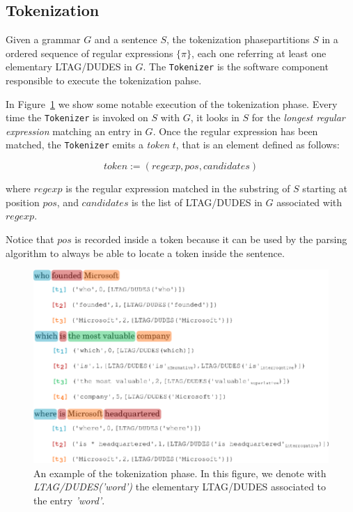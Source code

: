 \subsection{Tokenization}
\label{sec:parsing-tokenization}

Given a grammar $G$ and a sentence $S$, the tokenization phasepartitions $S$ in a ordered sequence of regular expressions $\{\pi\}$, each one referring at least one elementary LTAG/DUDES in $G$.
%
The \texttt{Tokenizer} is the software component responsible to execute the tokenization pahse.

In Figure~\ref{fig:tokenizer-sample} we show some notable execution of the tokenization phase.
%
Every time the \texttt{Tokenizer} is invoked on $S$ with $G$, it looks in $S$ for the \textit{longest regular expression} matching an entry in $G$.
%
Once the regular expression has been matched, the \texttt{Tokenizer} emits a \textit{token} $t$, that is an element defined as follows:

\begin{equation}
\label{eqn:token}
token:=(regexp,pos,candidates)
\end{equation}

where
$regexp$ is the regular expression matched in the substring of $S$ starting at position $pos$, and
$candidates$ is the list of LTAG/DUDES in $G$ associated with $regexp$.

Notice that $pos$ is recorded inside a token because it can be used by the parsing algorithm to always be able to locate a token inside the sentence.

\begin{figure}[tp]
	\centering
	\includegraphics[width=0.8\columnwidth]{./fig/tokenizer-sample}
	\caption{An example of the tokenization phase. In this figure, we denote with \textit{LTAG/DUDES('word')} the elementary LTAG/DUDES associated to the entry \textit{'word'}.}
	\label{fig:tokenizer-sample}
\end{figure}

